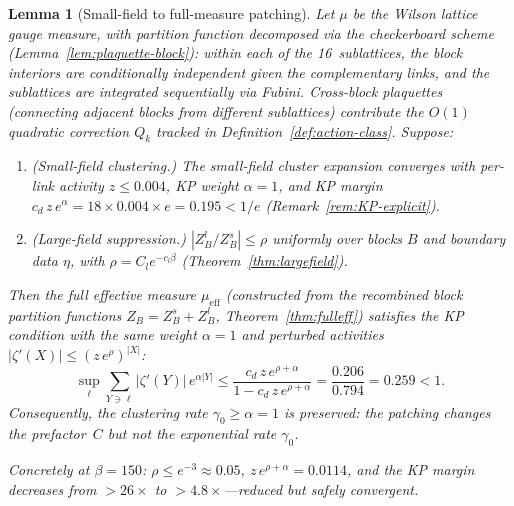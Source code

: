 \documentclass[11pt]{article}
\newtheorem{lemma}[theorem]{Lemma}
\theoremstyle{definition}
\begin{document}
\begin{lemma}[Small-field to full-measure patching]%
\label{lem:patch}
Let $\mu$ be the Wilson lattice gauge measure,
with partition function decomposed via the checkerboard
scheme (Lemma~\ref{lem:plaquette-block}): within each of
the 16~sublattices, the block interiors are conditionally
independent given the complementary links, and the
sublattices are integrated sequentially via Fubini.
Cross-block plaquettes (connecting adjacent blocks from
different sublattices) contribute the $O(1)$ quadratic
correction $Q_k$ tracked in Definition~\ref{def:action-class}.
Suppose:
\begin{enumerate}[nosep,label=(\roman*)]
\item \emph{(Small-field clustering.)}  The small-field
cluster expansion converges with per-link activity $z\le 0.004$,
KP weight $\alpha=1$, and KP margin
$c_d\,z\,e^\alpha=18\times 0.004\times e=0.195<1/e$
(Remark~\ref{rem:KP-explicit}).
\item \emph{(Large-field suppression.)}
$|Z_B^l/Z_B^s|\le\rho$ uniformly over blocks $B$ and
boundary data $\eta$, with $\rho=C_l e^{-c_l\beta}$
(Theorem~\ref{thm:largefield}).
\end{enumerate}
Then the full effective measure $\mu_{\mathrm{eff}}$
(constructed from the recombined block partition functions
$Z_B=Z_B^s+Z_B^l$, Theorem~\ref{thm:fulleff}) satisfies the
KP condition with the \emph{same} weight $\alpha=1$ and
perturbed activities $|\zeta'(X)|\le(z\,e^\rho)^{|X|}$:
\begin{equation}\label{eq:KP-perturbed}
\sup_\ell\sum_{Y\ni\ell}|\zeta'(Y)|\,e^{\alpha|Y|}
\le\frac{c_d\,z\,e^{\rho+\alpha}}{1-c_d\,z\,e^{\rho+\alpha}}
=\frac{0.206}{0.794}=0.259<1.
\end{equation}
Consequently, the clustering rate $\gamma_0\ge\alpha=1$
is \emph{preserved}: the patching changes the prefactor~$C$
but not the exponential rate $\gamma_0$.

Concretely at $\beta=150$: $\rho\le e^{-3}\approx 0.05$,
$z\,e^{\rho+\alpha}=0.0114$, and the KP margin decreases
from $>26\times$ to $>4.8\times$---reduced but safely
convergent.
\end{lemma}
\end{document}

